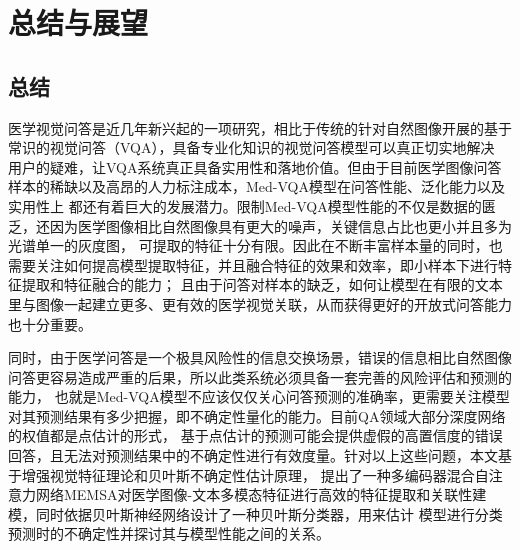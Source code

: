 \chapter{总结与展望}

\section*{总结}
医学视觉问答是近几年新兴起的一项研究，相比于传统的针对自然图像开展的基于常识的视觉问答（VQA），具备专业化知识的视觉问答模型可以真正切实地解决
用户的疑难，让VQA系统真正具备实用性和落地价值。但由于目前医学图像问答样本的稀缺以及高昂的人力标注成本，Med-VQA模型在问答性能、泛化能力以及实用性上
都还有着巨大的发展潜力。限制Med-VQA模型性能的不仅是数据的匮乏，还因为医学图像相比自然图像具有更大的噪声，关键信息占比也更小并且多为光谱单一的灰度图，
可提取的特征十分有限。因此在不断丰富样本量的同时，也需要关注如何提高模型提取特征，并且融合特征的效果和效率，即小样本下进行特征提取和特征融合的能力；
且由于问答对样本的缺乏，如何让模型在有限的文本里与图像一起建立更多、更有效的医学视觉关联，从而获得更好的开放式问答能力也十分重要。

同时，由于医学问答是一个极具风险性的信息交换场景，错误的信息相比自然图像问答更容易造成严重的后果，所以此类系统必须具备一套完善的风险评估和预测的能力，
也就是Med-VQA模型不应该仅仅关心问答预测的准确率，更需要关注模型对其预测结果有多少把握，即不确定性量化的能力。目前QA领域大部分深度网络的权值都是点估计的形式，
基于点估计的预测可能会提供虚假的高置信度的错误回答，且无法对预测结果中的不确定性进行有效度量。针对以上这些问题，本文基于增强视觉特征理论和贝叶斯不确定性估计原理，
提出了一种多编码器混合自注意力网络MEMSA对医学图像-文本多模态特征进行高效的特征提取和关联性建模，同时依据贝叶斯神经网络设计了一种贝叶斯分类器，用来估计
模型进行分类预测时的不确定性并探讨其与模型性能之间的关系。

